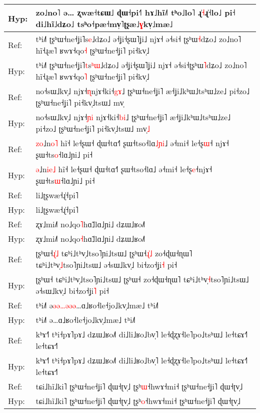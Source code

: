 \documentclass[10pt]{article}
\DeclareRobustCommand{\hl}[1]{{\textcolor{red}{#1}}}
\begin{document}
\begin{longtable}{ll}
Hyp: & zo˩no˥\hl{ }ə… ʐwæ˧tɕɯ˩ ɖɯ˧pi˧˥ hɤ˩hĩ˩˥ tʰo˩lo˥ ɻ̍\hl{˧}ɻ̍˧lo˩ pi˧ di˩hĩ˩dʑo˩ tsʰo˧pæ˧mv̩˥ʈʂæ˩\hl{ɣ}kv̩˩mæ˩ \\ 
\midrule 
Ref: & tʰi˩˥ ʈʂʰɯ˧ne˧ʝi˥s\hl{e}˩dʑo˩ ə˧ʝi˧ʂɯ˥ʝi˩ njɤ˧ ə˧si˧\hl{ }ʈʂʰɯ\hl{˧}dʑo˩ zo˩no˥ hĩ˧ɻæ˥ ʁwɤ˧qo\hl{˧} ʈʂʰɯ˧ne˧ʝi˥ pi˧kv̩˩ \\ 
Hyp: & tʰi˩˥ ʈʂʰɯ˧ne˧ʝi˥\hl{t}s\hl{ʰ}\hl{ɯ}˩dʑo˩ ə˧ʝi˧ʂɯ˥ʝi˩ njɤ˧ ə˧si˧ʈʂʰɯ\hl{˥}dʑo˩ zo˩no˥ hĩ˧ɻæ˥ ʁwɤ˧qo\hl{˥} ʈʂʰɯ˧ne˧ʝi˥ pi˧kv̩˩ \\ 
\midrule 
Ref: & no˧sɯ˩kv̩˩ njɤ˧\hl{ɳ}njɤ˧ki˧\hl{g}\hl{ɤ}˩ ʈʂʰɯ˧ne˧ʝi˥ æ˧ʝi˩kʰɯ˩tsʰɯ˩ze˩ pi˧zo˩ ʈʂʰɯ˧ne˧ʝi˥ pi˧kv̩˩tsɯ˩ mv̩ \\ 
Hyp: & no˧sɯ˩kv̩˩ njɤ˧\hl{ɲ}\hl{i}\hl{ }njɤ˧ki˧\hl{b}\hl{i}˩ ʈʂʰɯ˧ne˧ʝi˥ æ˧ʝi˩kʰɯ˩tsʰɯ˩ze˩ pi˧zo˩ ʈʂʰɯ˧ne˧ʝi˥ pi˧kv̩˩tsɯ˩ mv̩\hl{˩} \\ 
\midrule 
Ref: & \hl{z}\hl{o}˩n\hl{o}\hl{˥} hĩ˧ le˧ʂɯ˧ ɖɯ˧tɑ˧˥ ʂɯ˧tso˧lɑ\hl{˩}\hl{ɲ}\hl{i}˩ ə˧mi˧ le˧ʂ\hl{ɯ}˧\hl{ }njɤ˧ ʂɯ˧ts\hl{o}˧lɑ˩ɲi˩ pi˧ \\ 
Hyp: & \hl{ə}˩n\hl{i}\hl{e}\hl{˩} hĩ˧ le˧ʂɯ˧ ɖɯ˧tɑ˧˥ ʂɯ˧tso˧lɑ˩ ə˧mi˧ le˧ʂ\hl{e}˧njɤ˧ ʂɯ˧ts\hl{ɯ}˧lɑ˩ɲi˩ pi˧ \\ 
\midrule 
Ref: & li˩ʈʂwæ˧ɻ̍˧pi˥ \\ 
Hyp: & li˩ʈʂwæ˧ɻ̍˧pi˥ \\ 
\midrule 
Ref: & ʐɤ˩mi˩˥ no˩qo\hl{˥}hɑ̃˩lɑ˩ɲi˩ dʑɯ˩ʁo˩˥ \\ 
Hyp: & ʐɤ˩mi˩˥ no˩qo\hl{˧}hɑ̃˩lɑ˩ɲi˩ dʑɯ˩ʁo˩˥ \\ 
\midrule 
Ref: & ʈʂʰɯ˧\hl{ɻ}\hl{̍}\hl{˩} tɕʰi˩tʰv̩˩tso˥ɲi˩tsɯ˩ ʈʂʰɯ˧\hl{ɻ}\hl{̍}\hl{˩} zo˧ɖɯ˧ɳɯ˥ tɕʰi˩tʰv̩\hl{˩}tso˥ɲi˩tsɯ˩ ə˧sɯ˩kv̩˩ bi˧zo˧ʝi\hl{˧} pi˧ \\ 
Hyp: & ʈʂʰɯ˧ tɕʰi˩tʰv̩˩tso˥ɲi˩tsɯ˩ ʈʂʰɯ˧ zo˧ɖɯ˧ɳɯ˥ tɕʰi˩tʰv̩\hl{˧}tso˥ɲi˩tsɯ˩ ə˧sɯ˩kv̩˩ bi˧zo˧ʝi\hl{˥} pi˧ \\ 
\midrule 
Ref: & tʰi˩˥ ə\hl{ə}\hl{ə}\hl{…}\hl{ə}\hl{ə}\hl{ə}…ɑ˩ʁo˧le˧jo˩kv̩˩mæ˩ tʰi˩˥ \\ 
Hyp: & tʰi˩˥ ə…ɑ˩ʁo˧le˧jo˩kv̩˩mæ˩ tʰi˩˥ \\ 
\midrule 
Ref: & kʰɤ˧˥ tʰi˧pɤ˥pɤ˩ dʑɯ˩ʁo˩˥ di˩li˩ʁo˩bv̩˥ le˧ɖʐɤ˧le˥po˩tsʰɯ˩ le˧tɕɤ˧˥ le˧tɕɤ˧˥ \\ 
Hyp: & kʰɤ˧˥ tʰi˧pɤ˥pɤ˩ dʑɯ˩ʁo˩˥ di˩li˩ʁo˩bv̩˥ le˧ɖʐɤ˧le˥po˩tsʰɯ˩ le˧tɕɤ˧˥ le˧tɕɤ˧˥ \\ 
\midrule 
Ref: & tɕi˩hĩ˩ki˥ ʈʂʰɯ˧ne˧ʝi˥ ɖɯ˧ʈv̩˩ ʈʂʰ\hl{ɯ}˧hwɤ˧mi˧ ʈʂʰɯ˧ne˧ʝi˥ ɖɯ˧ʈv̩˩ \\ 
Hyp: & tɕi˩hĩ˩ki˥ ʈʂʰɯ˧ne˧ʝi˥ ɖɯ˧ʈv̩˩ ʈʂʰ\hl{o}˧hwɤ˧mi˧ ʈʂʰɯ˧ne˧ʝi˥ ɖɯ˧ʈv̩˩ \\ 

\end{longtable}
\end{document}
